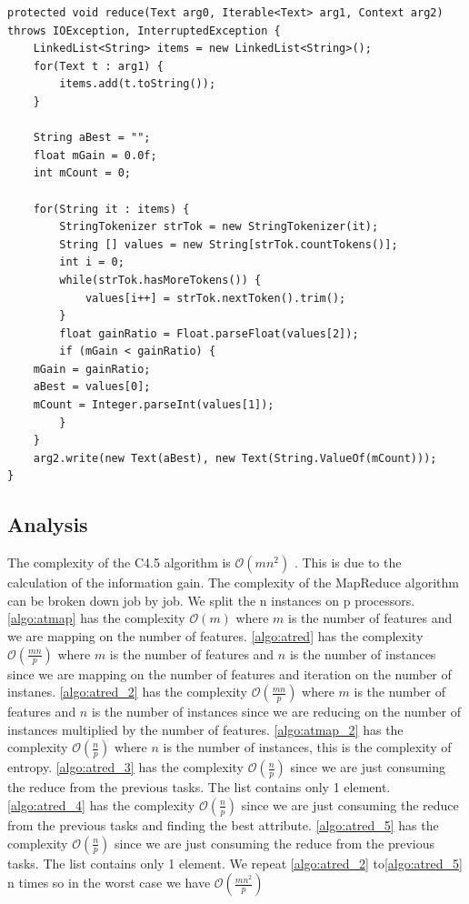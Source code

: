\documentclass{article}
\begin{document}
\begin{lstlisting}[caption={Attrib Selection Reducer 2 code snippet},label={lst:attrselred},style=MyJavaStyle]
protected void reduce(Text arg0, Iterable<Text> arg1, Context arg2)
throws IOException, InterruptedException {
    LinkedList<String> items = new LinkedList<String>();
    for(Text t : arg1) {
        items.add(t.toString());
    }

    String aBest = "";
    float mGain = 0.0f;
    int mCount = 0;

    for(String it : items) {
        StringTokenizer strTok = new StringTokenizer(it);
        String [] values = new String[strTok.countTokens()];
        int i = 0;
        while(strTok.hasMoreTokens()) {
            values[i++] = strTok.nextToken().trim();
        }
        float gainRatio = Float.parseFloat(values[2]);
        if (mGain < gainRatio) {
	mGain = gainRatio;
	aBest = values[0];
	mCount = Integer.parseInt(values[1]);
        }
    }
    arg2.write(new Text(aBest), new Text(String.ValueOf(mCount)));
}
\end{lstlisting}

\subsection{Analysis}
The complexity of the C4.5 algorithm is $\mathcal{O}(mn^{2})$ \cite{complexity}. This is due to the calculation of the information gain.
The complexity of the MapReduce algorithm can be broken down job by job. We split the n instances on p processors.
\ref{algo:atmap} has the complexity $\mathcal{O}(m)$ where $m$ is the number of features and we are mapping on the number of features.
\ref{algo:atred} has the complexity $\mathcal{O}(\frac{mn}{p})$ where $m$ is the number of features and $n$ is the number of instances since we are mapping on the number of features and iteration on the number of instanes.
\ref{algo:atred_2} has the complexity $\mathcal{O}(\frac{mn}{p})$ where $m$ is the number of features and $n$ is the number of instances since we are reducing on the number of instances multiplied by the number of features.
\ref{algo:atmap_2} has the complexity $\mathcal{O}(\frac{n}{p})$ where $n$ is the number of instances, this is the complexity of entropy. \cite{complexity}
\ref{algo:atred_3} has the complexity $\mathcal{O}(\frac{n}{p})$ since we are just consuming the reduce from the previous tasks. The list contains only 1 element.
\ref{algo:atred_4} has the complexity $\mathcal{O}(\frac{n}{p})$ since we are just consuming the reduce from the previous tasks and finding the best attribute.
\ref{algo:atred_5} has the complexity $\mathcal{O}(\frac{n}{p})$ since we are just consuming the reduce from the previous tasks. The list contains only 1 element.
We repeat \ref{algo:atred_2} to\ref{algo:atred_5} n times so in the worst case we have $\mathcal{O}(\frac{mn^{2}}{p})$
\end{document}
